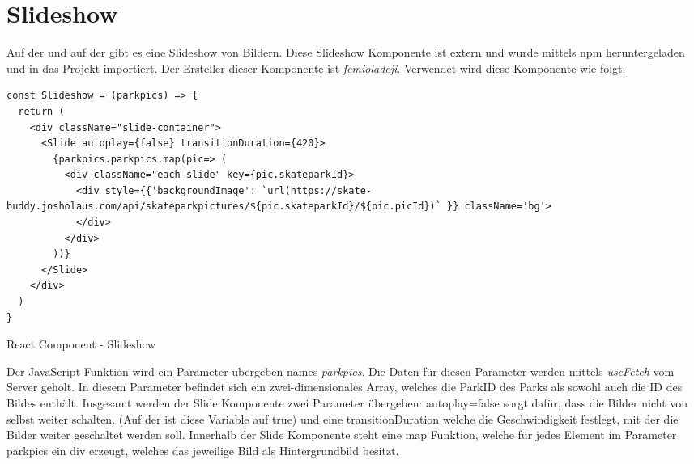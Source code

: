 \newpage
\section{Slideshow}
\label{slideshow}

Auf der \underline{} und auf der \underline{} gibt es eine Slideshow von Bildern.
Diese Slideshow Komponente ist extern und wurde mittels npm heruntergeladen und in das 
Projekt importiert. Der Ersteller dieser Komponente ist \textit{femioladeji}. Verwendet wird diese 
Komponente wie folgt:

\begin{code}[htp]
\begin{lstlisting}
const Slideshow = (parkpics) => {
  return (
    <div className="slide-container">
      <Slide autoplay={false} transitionDuration={420}>
        {parkpics.parkpics.map(pic=> (
          <div className="each-slide" key={pic.skateparkId}>
            <div style={{'backgroundImage': `url(https://skate-buddy.josholaus.com/api/skateparkpictures/${pic.skateparkId}/${pic.picId})` }} className='bg'>
            </div>
          </div>
        ))} 
      </Slide>
    </div>
  )
}
\end{lstlisting}
\caption{React Component - Slideshow}
\end{code}

Der JavaScript Funktion wird ein Parameter übergeben names \textit{parkpics}. Die 
Daten für diesen Parameter werden mittels \textit{useFetch} vom Server geholt. In diesem Parameter 
befindet sich ein zwei-dimensionales Array, welches die ParkID des Parks als sowohl auch die ID des 
Bildes enthält. Insgesamt werden der Slide Komponente zwei Parameter übergeben: autoplay={false} sorgt
dafür, dass die Bilder nicht von selbst weiter schalten. (Auf der \underline{} ist diese Variable auf true) und
eine transitionDuration welche die Geschwindigkeit festlegt, mit der die Bilder weiter geschaltet werden soll.
Innerhalb der Slide Komponente steht eine map Funktion, welche für jedes Element im Parameter parkpics 
ein div erzeugt, welches das jeweilige Bild als Hintergrundbild besitzt. 



